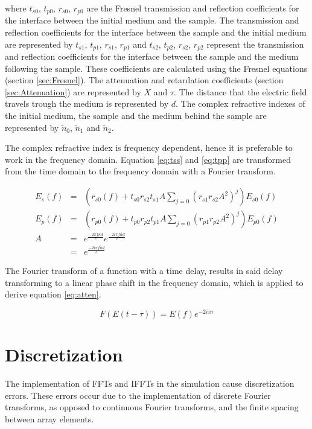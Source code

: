 where $t_{s0}$, $t_{p0}$, $r_{s0}$, $r_{p0}$ are the Fresnel transmission and reflection coefficients for the interface between the initial medium and the sample. The transmission and reflection coefficients for the interface between the sample and the initial medium are represented by $t_{s1}$, $t_{p1}$, $r_{s1}$, $r_{p1}$ and $t_{s2}$, $t_{p2}$, $r_{s2}$, $r_{p2}$ represent the transmission and reflection coefficients for the interface between the sample and the medium following the sample. These coefficients are calculated using the Fresnel equations (section \ref{sec:Fresnel}). The attenuation and retardation coefficients (section \ref{sec:Attenuation}) are represented by $X$ and $\tau$. The distance that the electric field travels trough the medium is represented by $d$. The complex refractive indexes of the initial medium, the sample and the medium behind the sample are represented by $\widetilde{n}_{0}$, $\widetilde{n}_{1}$ and $\widetilde{n}_{2}$.

The complex refractive index is frequency dependent, hence it is preferable to work in the frequency domain. Equation \ref{eq:tss} and \ref{eq:tpp} are transformed from the time domain to the frequency domain with a Fourier transform.

\begin{eqnarray}
E_{s}(f) &=& (r_{s0}(f) + t_{s0}r_{s2}t_{s1}A\sum_{j=0}{(r_{s1}r_{s2}A^{2})^{j}})E_{s0}(f)\label{eq:fss}\\
E_{p}(f) &=& (r_{p0}(f) + t_{p0}r_{p2}t_{p1}A\sum_{j=0}{(r_{p1}r_{p2}A^{2})^{j}})E_{p0}(f)\label{eq:fpp}\\
A &=& e^{\frac{-2\pi f\kappa d}{c}}e^{\frac{-2i\pi fnd}{c}}\nonumber\\
&=& e^{\frac{-2i\pi f\widetilde{n}d}{c}}\label{eq:atten}
\end{eqnarray}

The Fourier transform of a function with a time delay, results in said delay transforming to a linear phase shift in the frequency domain, which is applied to derive equation \ref{eq:atten}.

\begin{equation}
F(E(t - \tau)) = E(f)e^{-2i\pi\tau}
\end{equation}

\section{Discretization}
\label{sec:Disc}

The implementation of FFTs and IFFTs in the simulation cause discretization errors. These errors occur due to the implementation of discrete Fourier transforms, as opposed to continuous Fourier transforms, and the finite spacing between array elements.

